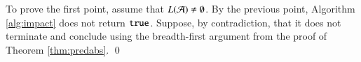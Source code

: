 \documentclass[10pt,conference,letterpaper,twocolumn]{IEEEtran}
\begin{document}
{  To prove the first point, assume that $L(\mathcal{A}) \neq \emptyset$. By the
  previous point, Algorithm \ref{alg:impact} does not return
  $\mathtt{true}$. Suppose, by contradiction, that it does not terminate and
  conclude using the breadth-first argument from the proof of Theorem
  \ref{thm:predabs}. \qed}

\end{document}
